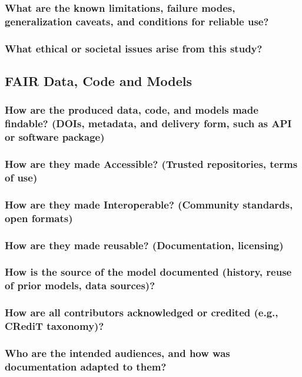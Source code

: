 \documentclass[sigconf]{acmart}
\begin{document}
\subsubsection{What are the known limitations, failure modes, generalization caveats, and conditions for reliable use?}
\subsubsection{What ethical or societal issues arise from this study?}

\subsection{FAIR Data, Code and Models}
\subsubsection{How are the produced data, code, and models made findable? (DOIs, metadata, and delivery form, such as API or software package)}
\subsubsection{How are they made Accessible? (Trusted repositories, terms of use)}
\subsubsection{How are they made Interoperable? (Community standards, open formats)}
\subsubsection{How are they made reusable? (Documentation, licensing)}
\subsubsection{How is the source of the model documented (history, reuse of prior models, data sources)?}
\subsubsection{How are all contributors acknowledged or credited (e.g., CRediT taxonomy)?}
\subsubsection{Who are the intended audiences, and how was documentation adapted to them?}
\end{document}
